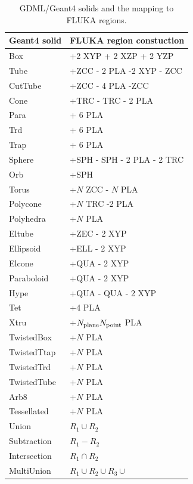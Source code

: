 \documentclass[final,5p,times,twocolumn]{elsarticle}
\begin{document}
\begin{table}[hbt!]
\centering
\begin{tabular}{ l  l  } \hline
Geant4 solid			& FLUKA region constuction		\\ \hline
Box					& +2 XYP + 2 XZP + 2 YZP 		\\
Tube					& +ZCC - 2 PLA -2 XYP - ZCC	 	\\
CutTube				& +ZCC - 4 PLA -ZCC			\\
Cone				& +TRC - TRC - 2 PLA 			\\
Para					& + 6 PLA						\\
Trd					& + 6 PLA						\\
Trap					& + 6 PLA						\\
Sphere				& +SPH - SPH  - 2 PLA - 2 TRC	\\
Orb					& +SPH						\\
Torus				& +$N$ ZCC  - $N$ PLA			\\
Polycone				& +$N$ TRC -2 PLA				\\
Polyhedra				& +$N$ PLA					\\
Eltube				& +ZEC  - 2 XYP				\\
Ellipsoid				& +ELL - 2 XYP		 			\\
Elcone				& +QUA - 2 XYP				\\
Paraboloid			& +QUA - 2 XYP				\\
Hype					& +QUA - QUA - 2 XYP			\\
Tet					& +4 PLA						\\
Xtru					& +$N_{\rm plane} N_{\rm point}$ PLA \\
TwistedBox			& +$N$ PLA					\\
TwistedTtap			& +$N$ PLA					\\
TwistedTrd			& +$N$ PLA				 	\\
TwistedTube			& +$N$ PLA					\\
Arb8					& +$N$ PLA					\\
Tessellated			& +$N$ PLA				 	\\
Union				& $R_1 \cup R_2$				\\
Subtraction			& $R_1 - R_2$					\\
Intersection			& $R_1 \cap R_2$				\\
MultiUnion			& $R_1 \cup R_2 \cup R_3 \cup$	\\ \hline
\end{tabular}
\label{tab:geant2fluka}
\caption{GDML/Geant4 solids and the mapping to FLUKA regions.}
\end{table}
\end{document}
